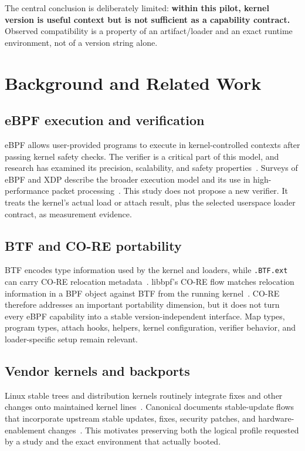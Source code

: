 \documentclass[10pt]{article}
\newcommand{\code}[1]{\texttt{#1}}
\begin{document}
The central conclusion is deliberately limited: \textbf{within this pilot, kernel version is useful context but is not sufficient as a capability contract.} Observed compatibility is a property of an artifact/loader and an exact runtime environment, not of a version string alone.

\section{Background and Related Work}
\subsection{eBPF execution and verification}
eBPF allows user-provided programs to execute in kernel-controlled contexts after passing kernel safety checks. The verifier is a critical part of this model, and research has examined its precision, scalability, and safety properties~\cite{gershuni2019verifier}. Surveys of eBPF and XDP describe the broader execution model and its use in high-performance packet processing~\cite{vieira2020ebpfxdp}. This study does not propose a new verifier. It treats the kernel's actual load or attach result, plus the selected userspace loader contract, as measurement evidence.

\subsection{BTF and CO-RE portability}
BTF encodes type information used by the kernel and loaders, while \code{.BTF.ext} can carry CO-RE relocation metadata~\cite{linux_btf,linux_bpf_docs}. libbpf's CO-RE flow matches relocation information in a BPF object against BTF from the running kernel~\cite{linux_libbpf_overview}. CO-RE therefore addresses an important portability dimension, but it does not turn every eBPF capability into a stable version-independent interface. Map types, program types, attach hooks, helpers, kernel configuration, verifier behavior, and loader-specific setup remain relevant.

\subsection{Vendor kernels and backports}
Linux stable trees and distribution kernels routinely integrate fixes and other changes onto maintained kernel lines~\cite{linux_backporting,linux_stable_rules}. Canonical documents stable-update flows that incorporate upstream stable updates, fixes, security patches, and hardware-enablement changes~\cite{ubuntu_kernel_sru}. This motivates preserving both the logical profile requested by a study and the exact environment that actually booted.
\end{document}
